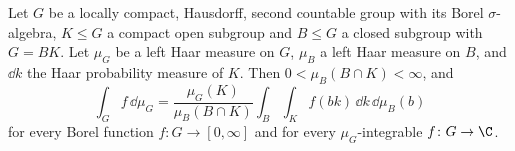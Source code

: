 Let $G$ be a locally compact, Hausdorff, second countable group with its Borel $\sigma$-algebra, $K\le G$ a compact
open subgroup and $B\le G$ a closed subgroup with $G=BK$. Let $\mu_G$ be a left Haar measure on $G$, $\mu_B$ a left Haar
measure on $B$, and $\dd k$ the Haar probability measure of $K$. Then $0<\mu_B(B\cap K)<\infty$, and
\[
  \int_Gf\,\dd\mu_G=\frac{\mu_G(K)}{\mu_B(B\cap K)}\int_B\int_Kf(bk)\,\dd k\,\dd\mu_B(b)
\]
for every Borel function $f\colon G\to[0,\infty]$ and for every $\mu_G$-integrable $f\colon G\to\C$.
